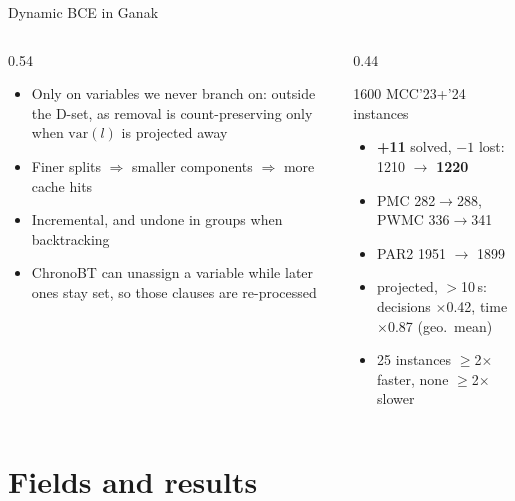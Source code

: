 \documentclass[aspectratio=169]{beamer}
\newcommand{\ganak}{\textsf{Ganak}}
\begin{document}
\begin{frame}{Dynamic BCE in \ganak{}}
  \begin{columns}[T]
    \begin{column}{0.54\textwidth}
      \small
      \begin{itemize}
        \item Only on variables we never branch on: outside the D-set,
          as removal is count-preserving only when $\mathrm{var}(l)$ is projected away
        \item Finer splits $\Rightarrow$ smaller components $\Rightarrow$
          more cache hits
        \item Incremental, and undone in groups when backtracking
        \item ChronoBT can unassign a variable while later ones stay set,
          so those clauses are re-processed
      \end{itemize}
    \end{column}
    \begin{column}{0.44\textwidth}
      \begin{exampleblock}{\small 1600 MCC'23+'24 instances}
        \small
        \begin{itemize}
          \item \textbf{+11} solved, $-1$ lost:\\ 1210 $\to$ \textbf{1220}
          \item PMC 282$\to$288, PWMC 336$\to$341
          \item PAR2 1951 $\to$ 1899
          \item projected, $>$10\,s: decisions $\times$0.42, time
            $\times$0.87 (geo.\ mean)
          \item 25 instances $\ge$2$\times$ faster, none $\ge$2$\times$ slower
        \end{itemize}
      \end{exampleblock}
    \end{column}
  \end{columns}
\end{frame}

\section{Fields and results}
\end{document}
